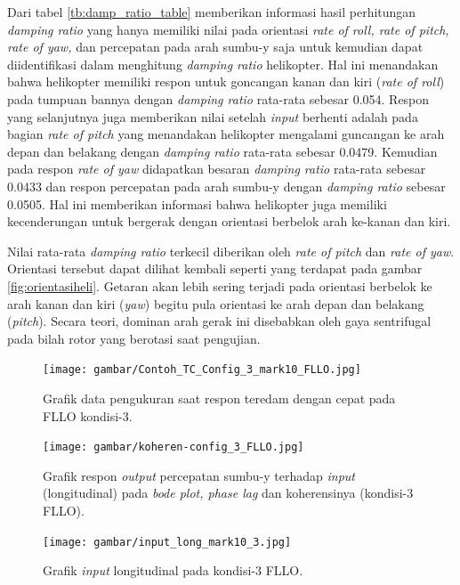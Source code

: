Dari tabel \ref{tb:damp_ratio_table} memberikan informasi hasil perhitungan \textit{damping ratio} yang hanya memiliki nilai pada orientasi \textit{rate of roll, rate of pitch, rate of yaw,} dan percepatan pada arah sumbu-y saja untuk kemudian dapat diidentifikasi dalam menghitung \textit{damping ratio} helikopter. Hal ini menandakan bahwa helikopter memiliki respon untuk goncangan kanan dan kiri (\textit{rate of roll}) pada tumpuan bannya dengan \textit{damping ratio} rata-rata sebesar 0.054. Respon yang selanjutnya juga memberikan nilai setelah \textit{input} berhenti adalah pada bagian \textit{rate of pitch} yang menandakan helikopter mengalami guncangan ke arah depan dan belakang dengan \textit{damping ratio} rata-rata sebesar 0.0479. Kemudian pada respon \textit{rate of yaw} didapatkan besaran \textit{damping ratio} rata-rata sebesar 0.0433 dan respon percepatan pada arah sumbu-y dengan \textit{damping ratio} sebesar 0.0505. Hal ini memberikan informasi bahwa helikopter juga memiliki kecenderungan untuk bergerak dengan orientasi berbelok arah ke-kanan dan kiri.

Nilai rata-rata \textit{damping ratio} terkecil diberikan oleh \textit{rate of pitch} dan \textit{rate of yaw}. Orientasi tersebut dapat dilihat kembali seperti yang terdapat pada gambar \ref{fig:orientasiheli}. Getaran akan lebih sering terjadi pada orientasi berbelok ke arah kanan dan kiri (\textit{yaw}) begitu pula orientasi ke arah depan dan belakang (\textit{pitch}). Secara teori, dominan arah gerak ini disebabkan oleh gaya sentrifugal pada bilah rotor yang berotasi saat pengujian.

\begin{figure}[H]
	\centering
	\texttt{[image: gambar/Contoh\_TC\_Config\_3\_mark10\_FLLO.jpg]}
	\caption{Grafik data pengukuran saat respon teredam dengan cepat pada FLLO kondisi-3.}
	\label{fig:FLLO-3_mark10}
\end{figure}

\begin{figure}[H]
	\centering
	\texttt{[image: gambar/koheren-config\_3\_FLLO.jpg]}
	\caption{Grafik respon \textit{output} percepatan sumbu-y terhadap \textit{input} (longitudinal) pada \textit{bode plot, phase lag} dan koherensinya (kondisi-3 FLLO).}
	\label{fig:koheren-3_FLLO}
\end{figure}

\begin{figure}[H]
	\centering
	\texttt{[image: gambar/input\_long\_mark10\_3.jpg]}
	\caption{Grafik \textit{input} longitudinal pada kondisi-3 FLLO.}
	\label{fig:input_long_mark10_3}
\end{figure}

